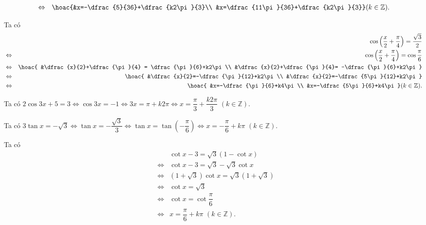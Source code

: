 \begin{bt}
{\begin{listEX}[1]
\begin{eqnarray*}
				&\Leftrightarrow& 
				\hoac{&x=-\dfrac{5}{36}+\dfrac{k2\pi}{3}\\ 
				&x=\dfrac{11\pi}{36}+\dfrac{k2\pi}{3}}  (k\in \mathbb{Z}).
			\end{eqnarray*}
			\item Ta có 
			 \allowdisplaybreaks
			\begin{eqnarray*}
				&&\cos \left(\dfrac{x}{2}+\dfrac{\pi}{4}\right) =\dfrac{\sqrt{3}}{2} \\ &\Leftrightarrow&  \cos \left(\dfrac{x}{2}+\dfrac{\pi}{4}\right)=\cos \dfrac{\pi}{6}\\
				&\Leftrightarrow& \hoac{ 
				&\dfrac{x}{2}+\dfrac{\pi}{4}  = \dfrac{\pi}{6}+k2\pi\\
				&\dfrac{x}{2}+\dfrac{\pi}{4}=  -\dfrac{\pi}{6}+k2\pi}\\
				 &\Leftrightarrow&
				 \hoac{
				&\dfrac{x}{2}=-\dfrac{\pi}{12}+k2\pi\\ 
				&\dfrac{x}{2}=-\dfrac{5\pi}{12}+k2\pi}\\ 
				&\Leftrightarrow& 
				 \hoac{
				&x=-\dfrac{\pi}{6}+k4\pi\\ 
				&x=-\dfrac{5\pi}{6}+k4\pi} (k\in \mathbb{Z}). 
			\end{eqnarray*}
			\item Ta có $2\cos 3x+5=3 \Leftrightarrow \cos 3x =-1 \Leftrightarrow 3x=\pi+k2\pi \Leftrightarrow x = \dfrac{\pi}{3}+\dfrac{k2\pi}{3}\,\,(k\in  \mathbb{Z})$.
			\item Ta có $3\tan x=-\sqrt{3} \Leftrightarrow \tan x =-\dfrac{\sqrt{3}}{3}  \Leftrightarrow
			\tan x=\tan \left(-\dfrac{\pi}{6}\right) \Leftrightarrow x=-\dfrac{\pi}{6}+k\pi\,\, (k\in  \mathbb{Z}).$
			\item Ta có 
			 \allowdisplaybreaks
			\begin{eqnarray*}
				 &&\cot x-3=\sqrt{3}\left(1-\cot x\right)\\
				&\Leftrightarrow& \cot  x-3 =\sqrt{3}-\sqrt{3}\cot x\\
				&\Leftrightarrow&  (1+\sqrt{3})\cot x=\sqrt{3}(1+\sqrt{3})\\
				&\Leftrightarrow& \cot x=\sqrt{3}\\ 
				&\Leftrightarrow&  \cot x=\cot \dfrac{\pi}{6}\\
				&\Leftrightarrow&  x=\dfrac{\pi}{6}+k\pi\,\, (k\in \mathbb{Z}).
			\end{eqnarray*}
		\end{listEX}
	} 
\end{bt}

